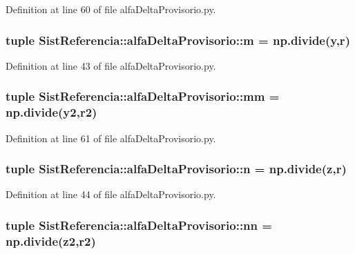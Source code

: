 \-Definition at line 60 of file alfa\-Delta\-Provisorio.\-py.

\subsubsection[{m}]{\setlength{\rightskip}{0pt plus 5cm}tuple {\bf \-Sist\-Referencia\-::alfa\-Delta\-Provisorio\-::m} = np.\-divide({\bf y},{\bf r})}\label{namespace_sist_referencia_1_1alfa_delta_provisorio_a42d82d9b93d1348d7472bdd7a843baaa}


\-Definition at line 43 of file alfa\-Delta\-Provisorio.\-py.

\subsubsection[{mm}]{\setlength{\rightskip}{0pt plus 5cm}tuple {\bf \-Sist\-Referencia\-::alfa\-Delta\-Provisorio\-::mm} = np.\-divide({\bf y2},{\bf r2})}\label{namespace_sist_referencia_1_1alfa_delta_provisorio_a4308407a5a00526a68ba871d63c91e34}


\-Definition at line 61 of file alfa\-Delta\-Provisorio.\-py.

\subsubsection[{n}]{\setlength{\rightskip}{0pt plus 5cm}tuple {\bf \-Sist\-Referencia\-::alfa\-Delta\-Provisorio\-::n} = np.\-divide({\bf z},{\bf r})}\label{namespace_sist_referencia_1_1alfa_delta_provisorio_abbcb03b79899402859cf6f3bee3ccdb6}


\-Definition at line 44 of file alfa\-Delta\-Provisorio.\-py.

\subsubsection[{nn}]{\setlength{\rightskip}{0pt plus 5cm}tuple {\bf \-Sist\-Referencia\-::alfa\-Delta\-Provisorio\-::nn} = np.\-divide({\bf z2},{\bf r2})}\label{namespace_sist_referencia_1_1alfa_delta_provisorio_afbb065214c219479a0f6a60267435904}


